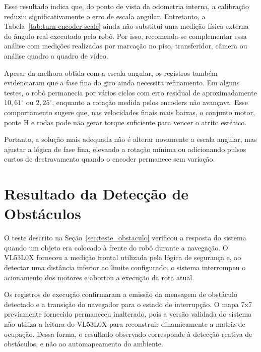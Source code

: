 \documentclass[	12pt, Times, openright, twoside, a4paper, english, brazil]{abntex2}
\begin{document}
Esse resultado indica que, do ponto de vista da odometria interna, a calibração reduziu significativamente o erro de escala angular. Entretanto, a Tabela~\ref{tab:turn-encoder-scale} ainda não substitui uma medição física externa do ângulo real executado pelo robô. Por isso, recomenda-se complementar essa análise com medições realizadas por marcação no piso, transferidor, câmera ou análise quadro a quadro de vídeo.




Apesar da melhora obtida com a escala angular, os registros também evidenciaram que a fase fina do giro ainda necessita refinamento. Em alguns testes, o robô permanecia por vários ciclos com erro residual de aproximadamente \(10{,}61^\circ\) ou \(2{,}25^\circ\), enquanto a rotação medida pelos encoders não avançava. Esse comportamento sugere que, nas velocidades finais mais baixas, o conjunto motor, ponte H e rodas pode não gerar torque suficiente para vencer o atrito estático.

Portanto, a solução mais adequada não é alterar novamente a escala angular, mas ajustar a lógica de fase fina, elevando a rotação mínima ou adicionando pulsos curtos de destravamento quando o encoder permanece sem variação.

\section{Resultado da Detecção de Obstáculos}
\label{sec:resultado_deteccao_obstaculos}

O teste descrito na Seção~\ref{sec:teste_obstaculo} verificou a resposta do sistema quando um objeto era colocado à frente do robô durante a navegação. O VL53L0X forneceu a medição frontal utilizada pela lógica de segurança e, ao detectar uma distância inferior ao limite configurado, o sistema interrompeu o acionamento dos motores e abortou a execução da rota atual.

Os registros de execução confirmaram a emissão da mensagem de obstáculo detectado e a transição do navegador para o estado de interrupção. O mapa 7x7 previamente fornecido permaneceu inalterado, pois a versão validada do sistema não utiliza a leitura do VL53L0X para reconstruir dinamicamente a matriz de ocupação. Dessa forma, o resultado observado corresponde à detecção reativa de obstáculos, e não ao automapeamento do ambiente.
\end{document}
